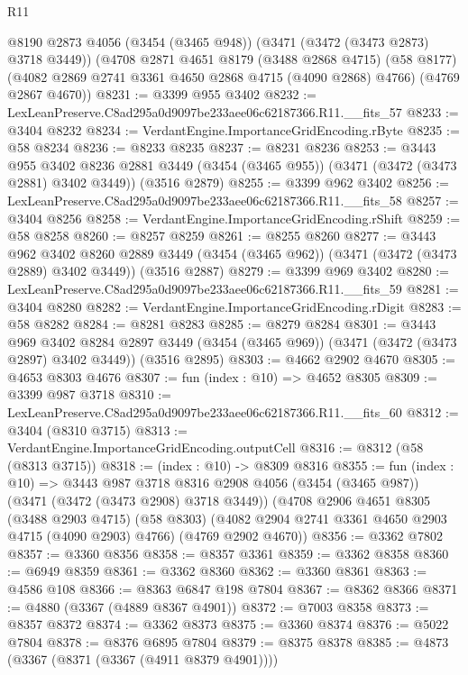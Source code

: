\begin{lexlean}{R11}
\begin{coremodule}
    @8190
    @2873
    @4056
    (@3454 (@3465 @948))
    (@3471 (@3472 (@3473 @2873) @3718 @3449))
    (@4708
      @2871
      @4651
      @8179
      (@3488 @2868 @4715)
      (@58 @8177)
      (@4082 @2869 @2741 @3361 @4650 @2868 @4715 (@4090 @2868) @4766)
      (@4769 @2867 @4670))
@8231 := @3399 @955 @3402
@8232 := LexLeanPreserve.C8ad295a0d9097be233aee06c62187366.R11.__fits_57
@8233 := @3404 @8232
@8234 := VerdantEngine.ImportanceGridEncoding.rByte
@8235 := @58 @8234
@8236 := @8233 @8235
@8237 := @8231 @8236
@8253 := @3443
    @955
    @3402
    @8236
    @2881
    @3449
    (@3454 (@3465 @955))
    (@3471 (@3472 (@3473 @2881) @3402 @3449))
    (@3516 @2879)
@8255 := @3399 @962 @3402
@8256 := LexLeanPreserve.C8ad295a0d9097be233aee06c62187366.R11.__fits_58
@8257 := @3404 @8256
@8258 := VerdantEngine.ImportanceGridEncoding.rShift
@8259 := @58 @8258
@8260 := @8257 @8259
@8261 := @8255 @8260
@8277 := @3443
    @962
    @3402
    @8260
    @2889
    @3449
    (@3454 (@3465 @962))
    (@3471 (@3472 (@3473 @2889) @3402 @3449))
    (@3516 @2887)
@8279 := @3399 @969 @3402
@8280 := LexLeanPreserve.C8ad295a0d9097be233aee06c62187366.R11.__fits_59
@8281 := @3404 @8280
@8282 := VerdantEngine.ImportanceGridEncoding.rDigit
@8283 := @58 @8282
@8284 := @8281 @8283
@8285 := @8279 @8284
@8301 := @3443
    @969
    @3402
    @8284
    @2897
    @3449
    (@3454 (@3465 @969))
    (@3471 (@3472 (@3473 @2897) @3402 @3449))
    (@3516 @2895)
@8303 := @4662 @2902 @4670
@8305 := @4653 @8303 @4676
@8307 := fun (index : @10) => @4652 @8305
@8309 := @3399 @987 @3718
@8310 := LexLeanPreserve.C8ad295a0d9097be233aee06c62187366.R11.__fits_60
@8312 := @3404 (@8310 @3715)
@8313 := VerdantEngine.ImportanceGridEncoding.outputCell
@8316 := @8312 (@58 (@8313 @3715))
@8318 := (index : @10) -> @8309 @8316
@8355 := fun (index : @10) =>
  @3443
    @987
    @3718
    @8316
    @2908
    @4056
    (@3454 (@3465 @987))
    (@3471 (@3472 (@3473 @2908) @3718 @3449))
    (@4708
      @2906
      @4651
      @8305
      (@3488 @2903 @4715)
      (@58 @8303)
      (@4082 @2904 @2741 @3361 @4650 @2903 @4715 (@4090 @2903) @4766)
      (@4769 @2902 @4670))
@8356 := @3362 @7802
@8357 := @3360 @8356
@8358 := @8357 @3361
@8359 := @3362 @8358
@8360 := @6949 @8359
@8361 := @3362 @8360
@8362 := @3360 @8361
@8363 := @4586 @108
@8366 := @8363 @6847 @198 @7804
@8367 := @8362 @8366
@8371 := @4880 (@3367 (@4889 @8367 @4901))
@8372 := @7003 @8358
@8373 := @8357 @8372
@8374 := @3362 @8373
@8375 := @3360 @8374
@8376 := @5022 @7804
@8378 := @8376 @6895 @7804
@8379 := @8375 @8378
@8385 := @4873 (@3367 (@8371 (@3367 (@4911 @8379 @4901))))

\end{coremodule}
\end{lexlean}
